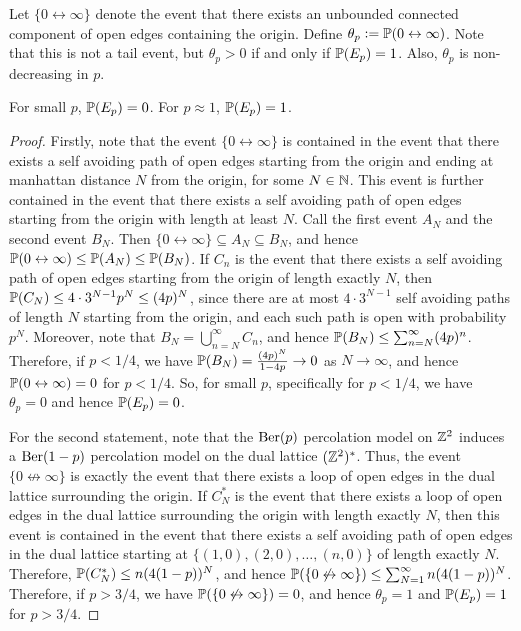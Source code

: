 Let $\{0 \leftrightarrow \infty\}$ denote the event that there exists an unbounded connected component of open edges containing the origin. Define $\theta_{p} \vcentcolon= \mathbb{P}(0 \leftrightarrow \infty)$. Note that this is not a tail event, but $\theta_{p} > 0$ if and only if $\mathbb{P}(E_{p}) = 1$. Also, $\theta_{p}$ is non-decreasing in $p$.

\begin{lemma}
    For small $p$, $\mathbb{P}(E_{p}) = 0$. For $p \approx 1$, $\mathbb{P}(E_{p}) = 1$.
\end{lemma}
\begin{proof}
    Firstly, note that the event $\{0 \leftrightarrow \infty\}$ is contained in the event that there exists a self avoiding path of open edges starting from the origin and ending at manhattan distance $N$ from the origin, for some $N \in \mathbb{N}$. This event is further contained in the event that there exists a self avoiding path of open edges starting from the origin with length at least $N$. Call the first event $A_{N}$ and the second event $B_{N}$. Then $\{0 \leftrightarrow \infty\} \subseteq A_{N} \subseteq B_{N}$, and hence $\mathbb{P}(0 \leftrightarrow \infty) \leq \mathbb{P}(A_{N}) \leq \mathbb{P}(B_{N})$. If $C_{n}$ is the event that there exists a self avoiding path of open edges starting from the origin of length exactly $N$, then $\mathbb{P}(C_{N}) \leq 4 \cdot 3^{N-1} p^{N} \leq (4p)^{N}$, since there are at most $4 \cdot 3^{N-1}$ self avoiding paths of length $N$ starting from the origin, and each such path is open with probability $p^{N}$. Moreover, note that $B_{N} = \bigcup_{n=N}^{\infty} C_{n}$, and hence $\mathbb{P}(B_{N}) \leq \sum_{n=N}^{\infty} (4p)^{n}$. Therefore, if $p < 1/4$, we have $\mathbb{P}(B_{N}) = \frac{(4p)^{N}}{1-4p} \to 0$ as $N \to \infty$, and hence $\mathbb{P}(0 \leftrightarrow \infty) = 0$ for $p < 1/4$. So, for small $p$, specifically for $p < 1/4$, we have $\theta_{p} = 0$ and hence $\mathbb{P}(E_{p}) = 0$.

    For the second statement, note that the $\operatorname{Ber}(p)$ percolation model on $\mathbb{Z}^{2}$ induces a $\operatorname{Ber}(1-p)$ percolation model on the dual lattice $(\mathbb{Z}^{2})^{*}$. Thus, the event $\{0 \not\leftrightarrow \infty\}$ is exactly the event that there exists a loop of open edges in the dual lattice surrounding the origin. If $C_{N}^{*}$ is the event that there exists a loop of open edges in the dual lattice surrounding the origin with length exactly $N$, then this event is contained in the event that there exists a self avoiding path of open edges in the dual lattice starting at $\{(1,0),(2,0),\ldots,(n,0)\}$ of length exactly $N$. Therefore, $\mathbb{P}(C_{N}^{*}) \leq n(4(1-p))^{N}$, and hence $\mathbb{P}(\{0 \not\leftrightarrow \infty\}) \leq \sum_{N=1}^{\infty} n(4(1-p))^{N}$. Therefore, if $p > 3/4$, we have $\mathbb{P}(\{0 \not\leftrightarrow \infty\}) = 0$, and hence $\theta_{p} = 1$ and $\mathbb{P}(E_{p}) = 1$ for $p > 3/4$.
\end{proof}

